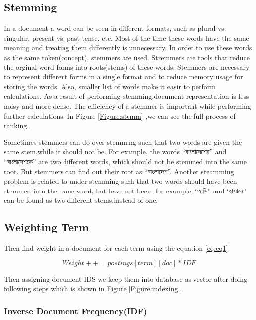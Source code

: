 \subsection{Stemming}

In a document a word can be seen in different formats, such as plural vs. singular, present vs. past tense, etc. Most of the time these words have the same meaning and treating them differently is unnecessary. In order to use these words as the same token(concept), stemmers are used.
Stremmers are tools that reduce the orginal word forms into roots(stems) of these words. Stemmers are necessary to represent different forms in a single format and to reduce memory usage for storing the words. Also, smaller list of words make it easir to perform calculations. As a result of performing stemming,document representation is less noisy and more dense. The efficiency of a stemmer is important while performing further calculations. In Figure \ref{Figure:stemm} ,we can see the full process of ranking.

Sometimes stemmers can do over-stemming such that two words are given the same stem,while it should not be. For example, the words {\unicodefont “বাংলাদেশের”} and {\unicodefont “বাংলাদেশকে”} are two different words, which should not be stemmed into the same root. But stemmers can find out their root as {\unicodefont “বাংলাদেশ”}. Another steamming problem is related to under stemming such that two words should have been stemmed into the same word, but have not been. for example, {\unicodefont “হাসি”} and {\unicodefont ‘হাসানো’} can be found as two different stems,instead of one.



\subsection{Weighting Term}

Then find weight in a document for each term using the equation \ref{eq:eq1}

\begin{equation}
Weight++=postings[term][doc]*IDF
\label{eq:eq1}
\end{equation}


Then assigning document IDS we keep them into database as vector after doing following steps which is shown in Figure \ref{Figure:indexing}.

\subsubsection{Inverse Document Frequency(IDF)}

